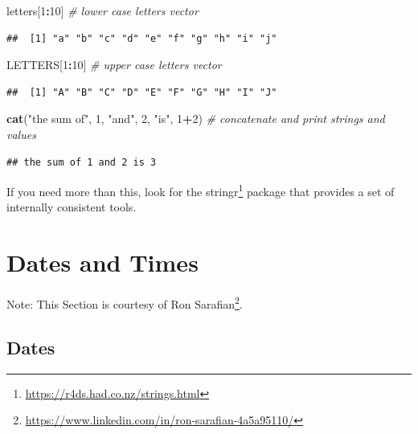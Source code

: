 \documentclass[]{book}
\newenvironment{Shaded}{\begin{snugshade}}{\end{snugshade}}
\newcommand{\CommentTok}[1]{\textcolor[rgb]{0.56,0.35,0.01}{\textit{#1}}}
\newcommand{\DecValTok}[1]{\textcolor[rgb]{0.00,0.00,0.81}{#1}}
\newcommand{\KeywordTok}[1]{\textcolor[rgb]{0.13,0.29,0.53}{\textbf{#1}}}
\newcommand{\NormalTok}[1]{#1}
\newcommand{\OperatorTok}[1]{\textcolor[rgb]{0.81,0.36,0.00}{\textbf{#1}}}
\newcommand{\StringTok}[1]{\textcolor[rgb]{0.31,0.60,0.02}{#1}}
\renewcommand{\href}[2]{#2\footnote{\url{#1}}}
\theoremstyle{definition}
\theoremstyle{definition}
\theoremstyle{definition}
\theoremstyle{remark}
\begin{document}
\begin{Shaded}
\begin{Highlighting}[]
\NormalTok{letters[}\DecValTok{1}\OperatorTok{:}\DecValTok{10}\NormalTok{] }\CommentTok{# lower case letters vector}
\end{Highlighting}
\end{Shaded}

\begin{verbatim}
##  [1] "a" "b" "c" "d" "e" "f" "g" "h" "i" "j"
\end{verbatim}

\begin{Shaded}
\begin{Highlighting}[]
\NormalTok{LETTERS[}\DecValTok{1}\OperatorTok{:}\DecValTok{10}\NormalTok{] }\CommentTok{# upper case letters vector}
\end{Highlighting}
\end{Shaded}

\begin{verbatim}
##  [1] "A" "B" "C" "D" "E" "F" "G" "H" "I" "J"
\end{verbatim}

\begin{Shaded}
\begin{Highlighting}[]
\KeywordTok{cat}\NormalTok{(}\StringTok{"the sum of"}\NormalTok{, }\DecValTok{1}\NormalTok{, }\StringTok{"and"}\NormalTok{, }\DecValTok{2}\NormalTok{, }\StringTok{"is"}\NormalTok{, }\DecValTok{1}\OperatorTok{+}\DecValTok{2}\NormalTok{) }\CommentTok{#  concatenate and print strings and values}
\end{Highlighting}
\end{Shaded}

\begin{verbatim}
## the sum of 1 and 2 is 3
\end{verbatim}

If you need more than this, look for the \href{https://r4ds.had.co.nz/strings.html}{stringr} package that provides a set of internally consistent tools.

\hypertarget{dates-and-times}{%
\section{Dates and Times}\label{dates-and-times}}

Note: This Section is courtesy of \href{https://www.linkedin.com/in/ron-sarafian-4a5a95110/}{Ron Sarafian}.

\hypertarget{dates}{%
\subsection{Dates}\label{dates}}
\end{document}
